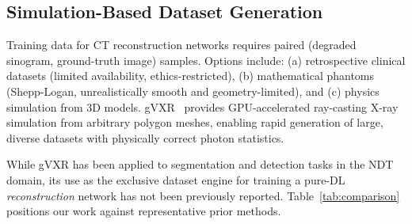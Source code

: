 \documentclass[10pt,twocolumn]{article}
\begin{document}
\subsection{Simulation-Based Dataset Generation}

Training data for CT reconstruction networks requires paired
(degraded sinogram, ground-truth image) samples.
Options include: (a) retrospective clinical datasets
(limited availability, ethics-restricted),
(b) mathematical phantoms (Shepp-Logan, unrealistically smooth
and geometry-limited),
and (c) physics simulation from 3D models.
gVXR~\cite{vidal2019gvxr} provides GPU-accelerated ray-casting
X-ray simulation from arbitrary polygon meshes, enabling rapid
generation of large, diverse datasets with physically correct
photon statistics.

While gVXR has been applied to segmentation and
detection tasks in the NDT domain, its use as the exclusive
dataset engine for training a pure-DL \emph{reconstruction}
network has not been previously reported.
Table~\ref{tab:comparison} positions our work against
representative prior methods.

\begin{table}[H]
    \centering
    \caption{%
        Comparison with representative related methods.
        \checkmark~=~yes, $\times$~=~no.
        CDT = Convolutional Domain Transformer (ours).
    }
    \label{tab:comparison}
\end{table}
\end{document}
